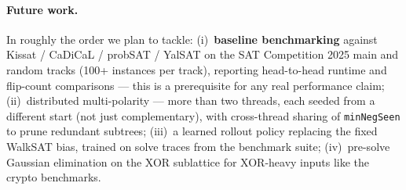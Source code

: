 \documentclass[11pt]{article}
\begin{document}
\paragraph{Future work.} In roughly the order we plan to tackle:
(i)~\textbf{baseline benchmarking} against Kissat / CaDiCaL / probSAT
/ YalSAT on the SAT Competition 2025 main and random tracks
(100+ instances per track), reporting head-to-head runtime and
flip-count comparisons — this is a prerequisite for any real
performance claim;
(ii)~distributed multi-polarity — more than two threads, each seeded
from a different start (not just complementary), with cross-thread
sharing of \texttt{minNegSeen} to prune redundant subtrees;
(iii)~a learned rollout policy replacing the fixed WalkSAT bias,
trained on solve traces from the benchmark suite;
(iv)~pre-solve Gaussian elimination on the XOR sublattice for
XOR-heavy inputs like the crypto benchmarks.
\end{document}
